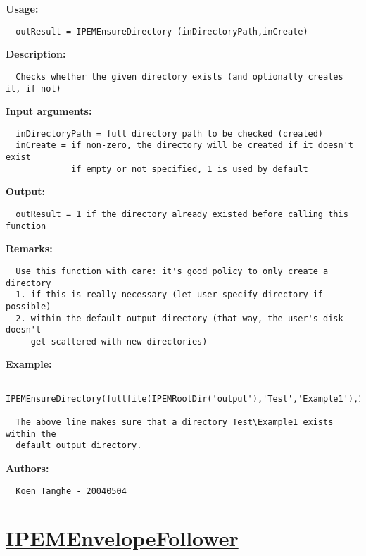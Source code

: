 \textbf{Usage:}
\begin{verbatim}  outResult = IPEMEnsureDirectory (inDirectoryPath,inCreate)

\end{verbatim}
\textbf{Description:}
\begin{verbatim}  Checks whether the given directory exists (and optionally creates it, if not)

\end{verbatim}
\textbf{Input arguments:}
\begin{verbatim}  inDirectoryPath = full directory path to be checked (created)
  inCreate = if non-zero, the directory will be created if it doesn't exist
             if empty or not specified, 1 is used by default

\end{verbatim}
\textbf{Output:}
\begin{verbatim}  outResult = 1 if the directory already existed before calling this function

\end{verbatim}
\textbf{Remarks:}
\begin{verbatim}  Use this function with care: it's good policy to only create a directory
  1. if this is really necessary (let user specify directory if possible)
  2. within the default output directory (that way, the user's disk doesn't
     get scattered with new directories)

\end{verbatim}
\textbf{Example:}
\begin{verbatim}  IPEMEnsureDirectory(fullfile(IPEMRootDir('output'),'Test','Example1'),1);

  The above line makes sure that a directory Test\Example1 exists within the
  default output directory.

\end{verbatim}
\textbf{Authors:}
\begin{verbatim}  Koen Tanghe - 20040504
\end{verbatim}


\newpage
\section*{\hyperlink{Concepts:IPEMEnvelopeFollower}{IPEMEnvelopeFollower}}
\hypertarget{FuncRef:IPEMEnvelopeFollower}{}

